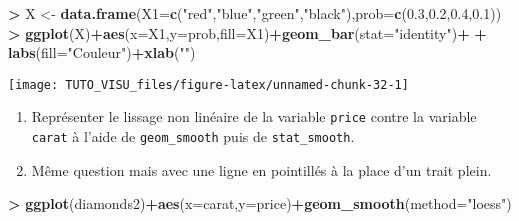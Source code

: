 \documentclass[]{article}
\newenvironment{Shaded}{\begin{snugshade}}{\end{snugshade}}
\newcommand{\DataTypeTok}[1]{\textcolor[rgb]{0.13,0.29,0.53}{#1}}
\newcommand{\FloatTok}[1]{\textcolor[rgb]{0.00,0.00,0.81}{#1}}
\newcommand{\KeywordTok}[1]{\textcolor[rgb]{0.13,0.29,0.53}{\textbf{#1}}}
\newcommand{\NormalTok}[1]{#1}
\newcommand{\OperatorTok}[1]{\textcolor[rgb]{0.81,0.36,0.00}{\textbf{#1}}}
\newcommand{\StringTok}[1]{\textcolor[rgb]{0.31,0.60,0.02}{#1}}
\providecommand{\tightlist}{%
  \setlength{\itemsep}{0pt}\setlength{\parskip}{0pt}}
\theoremstyle{definition}
\theoremstyle{definition}
\theoremstyle{definition}
\theoremstyle{remark}
\let\BeginKnitrBlock\begin \let\EndKnitrBlock\end
\begin{document}
\begin{Shaded}
\begin{Highlighting}[]
\OperatorTok{>}\StringTok{ }\NormalTok{X <-}\StringTok{ }\KeywordTok{data.frame}\NormalTok{(}\DataTypeTok{X1=}\KeywordTok{c}\NormalTok{(}\StringTok{"red"}\NormalTok{,}\StringTok{"blue"}\NormalTok{,}\StringTok{"green"}\NormalTok{,}\StringTok{"black"}\NormalTok{),}\DataTypeTok{prob=}\KeywordTok{c}\NormalTok{(}\FloatTok{0.3}\NormalTok{,}\FloatTok{0.2}\NormalTok{,}\FloatTok{0.4}\NormalTok{,}\FloatTok{0.1}\NormalTok{))}
\OperatorTok{>}\StringTok{ }\KeywordTok{ggplot}\NormalTok{(X)}\OperatorTok{+}\KeywordTok{aes}\NormalTok{(}\DataTypeTok{x=}\NormalTok{X1,}\DataTypeTok{y=}\NormalTok{prob,}\DataTypeTok{fill=}\NormalTok{X1)}\OperatorTok{+}\KeywordTok{geom_bar}\NormalTok{(}\DataTypeTok{stat=}\StringTok{"identity"}\NormalTok{)}\OperatorTok{+}
\OperatorTok{+}\StringTok{   }\KeywordTok{labs}\NormalTok{(}\DataTypeTok{fill=}\StringTok{"Couleur"}\NormalTok{)}\OperatorTok{+}\KeywordTok{xlab}\NormalTok{(}\StringTok{""}\NormalTok{)}
\end{Highlighting}
\end{Shaded}

\begin{center}\texttt{[image: TUTO\_VISU\_files/figure-latex/unnamed-chunk-32-1]} \end{center}

\BeginKnitrBlock{exercise}[Lissage]
\protect\hypertarget{exr:exo-stat2}{}{\label{exr:exo-stat2} \iffalse (Lissage) \fi{} }
\EndKnitrBlock{exercise}

\begin{enumerate}
\def\labelenumi{\arabic{enumi}.}
\tightlist
\item
  Représenter le lissage non linéaire de la variable \texttt{price} contre la variable \texttt{carat} à l'aide de \texttt{geom\_smooth} puis de \texttt{stat\_smooth}.
\item
  Même question mais avec une ligne en pointillés à la place d'un trait plein.
\end{enumerate}

\begin{Shaded}
\begin{Highlighting}[]
\OperatorTok{>}\StringTok{ }\KeywordTok{ggplot}\NormalTok{(diamonds2)}\OperatorTok{+}\KeywordTok{aes}\NormalTok{(}\DataTypeTok{x=}\NormalTok{carat,}\DataTypeTok{y=}\NormalTok{price)}\OperatorTok{+}\KeywordTok{geom_smooth}\NormalTok{(}\DataTypeTok{method=}\StringTok{"loess"}\NormalTok{)}
\end{Highlighting}
\end{Shaded}
\end{document}
